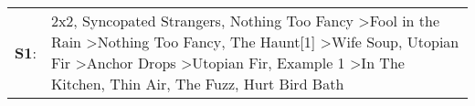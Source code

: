 \begin{supertabular}{p{0.03\textwidth}p{0.92\textwidth}}
 \textbf{S1}:  &  2x2\textsuperscript{}, \enspace Syncopated Strangers\textsuperscript{}, \enspace Nothing Too Fancy\textsuperscript{} \textgreater \enspace Fool in the Rain\textsuperscript{} \textgreater \enspace Nothing Too Fancy\textsuperscript{}, \enspace The Haunt[1]\textsuperscript{} \textgreater \enspace Wife Soup\textsuperscript{}, \enspace Utopian Fir\textsuperscript{} \textgreater \enspace Anchor Drops\textsuperscript{} \textgreater \enspace Utopian Fir\textsuperscript{}, \enspace Example 1\textsuperscript{} \textgreater \enspace In The Kitchen\textsuperscript{}, \enspace Thin Air\textsuperscript{}, \enspace The Fuzz\textsuperscript{}, \enspace Hurt Bird Bath\textsuperscript{}  \enspace  \\
\end{supertabular}
